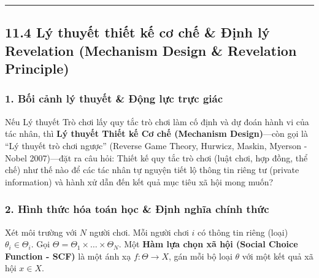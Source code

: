 \documentclass[
]{article}
\begin{document}
\begin{center}\rule{0.5\linewidth}{0.5pt}\end{center}

\subsection{11.4 Lý thuyết thiết kế cơ chế \& Định lý Revelation
(Mechanism Design \& Revelation
Principle)}\label{luxfd-thuyux1ebft-thiux1ebft-kux1ebf-cux1a1-chux1ebf-ux111ux1ecbnh-luxfd-revelation-mechanism-design-revelation-principle}

\subsubsection{1. Bối cảnh lý thuyết \& Động lực trực
giác}\label{bux1ed1i-cux1ea3nh-luxfd-thuyux1ebft-ux111ux1ed9ng-lux1ef1c-trux1ef1c-giuxe1c-3}

Nếu Lý thuyết Trò chơi lấy quy tắc trò chơi làm cố định và dự đoán hành
vi của tác nhân, thì \textbf{Lý thuyết Thiết kế Cơ chế (Mechanism
Design)}---còn gọi là ``Lý thuyết trò chơi ngược'' (Reverse Game Theory,
Hurwicz, Maskin, Myerson - Nobel 2007)---đặt ra câu hỏi: Thiết kế quy
tắc trò chơi (luật chơi, hợp đồng, thể chế) như thế nào để các tác nhân
tự nguyện tiết lộ thông tin riêng tư (private information) và hành xử
dẫn đến kết quả mục tiêu xã hội mong muốn?

\subsubsection{2. Hình thức hóa toán học \& Định nghĩa chính
thức}\label{huxecnh-thux1ee9c-huxf3a-touxe1n-hux1ecdc-ux111ux1ecbnh-nghux129a-chuxednh-thux1ee9c-3}

Xét môi trường với \(N\) người chơi. Mỗi người chơi \(i\) có thông tin
riêng (loại) \(\theta_i \in \Theta_i\). Gọi
\(\Theta = \Theta_1 \times \dots \times \Theta_N\). Một \textbf{Hàm lựa
chọn xã hội (Social Choice Function - SCF)} là một ánh xạ
\(f: \Theta \to X\), gán mỗi bộ loại \(\theta\) với một kết quả xã hội
\(x \in X\).
\end{document}
